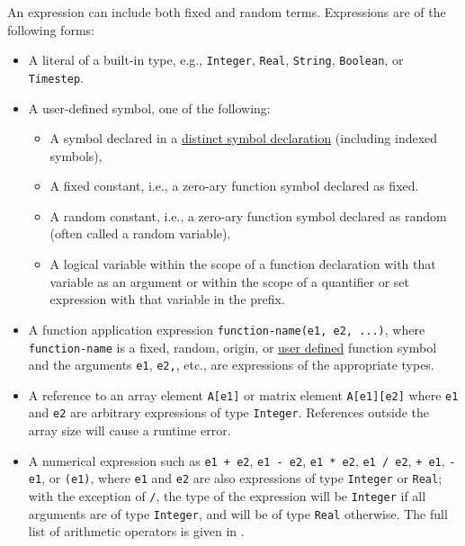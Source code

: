 \documentclass[12pt]{article}
\begin{document}
An expression can include both fixed and random terms.  Expressions are of the following forms:
\begin{itemize}
\item A literal of a built-in type, e.g., {\tt Integer}, {\tt Real},
  {\tt String}, {\tt Boolean}, or {\tt Timestep}.
\item A user-defined symbol, one of the following:
\begin{itemize}
\item A symbol declared in a \hyperref[distinct-section]{distinct
  symbol declaration} (including indexed symbols),
\item A fixed constant, i.e., a zero-ary function symbol declared as fixed.
\item A random constant, i.e., a zero-ary function symbol declared as
  random (often called a random variable).
\item A logical variable within the scope of a function declaration
  with that variable as an argument or within the scope of a
  quantifier or set expression with that variable in the prefix.
\end{itemize}
\item A function application expression {\tt function-name(e1, e2,
  ...)}, where {\tt function-name} is a fixed, random, origin, or
  \hyperref[user-defined-function-section]{user defined} function
  symbol and the arguments {\tt e1}, {\tt e2,}, etc., are
  expressions of the appropriate types.
\item A reference to an array element {\tt A[e1]} or matrix element
  {\tt A[e1][e2]} where {\tt e1} and {\tt e2} are arbitrary
  expressions of type \verb|Integer|.%
  References outside the array size will cause a runtime error.
\item A numerical expression such as \texttt{e1 + e2}, \texttt{e1 - e2},
  \texttt{e1 * e2}, \texttt{e1 / e2},  \texttt{+ e1},
  \texttt{- e1}, or \texttt{(e1)}, 
  where \texttt{e1} and \texttt{e2} are also expressions of
  type \texttt{Integer} or \texttt{Real};
  with the exception of {\tt /}, the type of the expression will be
  {\tt Integer} if all arguments are of type {\tt Integer}, and will
  be of type {\tt Real} otherwise. The full list of arithmetic
  operators is given in .

\end{itemize}
\end{document}
